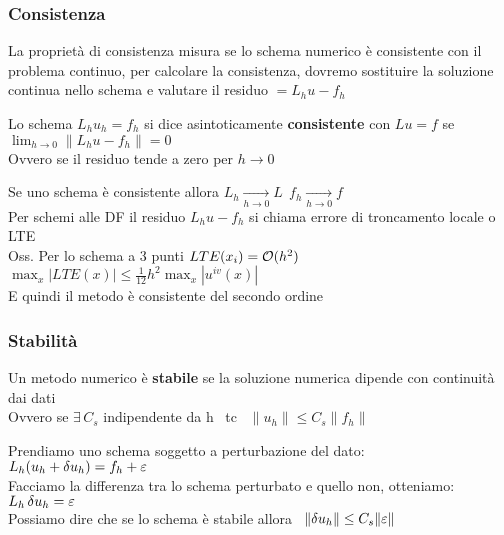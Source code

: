 \documentclass{article}
\let \oldexists \exists
\renewcommand{\exists}{\oldexists\,}
\begin{document}
\subsubsection{Consistenza}

La proprietà di consistenza misura se lo schema numerico è consistente con il problema continuo, per calcolare la consistenza, dovremo sostituire la soluzione continua nello schema e valutare il residuo $= L_h u-f_h$\\

\begin{defi}
    Lo schema $L_hu_h=f_h$ si dice asintoticamente \textbf{consistente} con $Lu=f$ se \ $\displaystyle \lim_{h\to0}\|L_hu-f_h\|=0$\\
    Ovvero se il residuo tende a zero per $h\to0$
\end{defi}

Se uno schema è consistente allora $L_h\xrightarrow[h\to0]{}L \ \ f_h \xrightarrow[h\to0]{}f$\\

Per schemi alle DF il residuo $L_hu-f_h$ si chiama errore di troncamento locale o LTE\\


Oss. Per lo schema a 3 punti $LTE(x_i)=\mathcal O(h^2)$ \ \ $\displaystyle\max_x |LTE(x)|\le \frac{1}{12}h^2\max_{x}|u^{iv}(x)|$\\
E quindi il metodo è consistente del secondo ordine\\




\subsubsection{Stabilità}

\begin{defi}
    Un metodo numerico è \textbf{stabile} se la soluzione numerica dipende con continuità dai dati\\
    Ovvero se $\exists C_s$ indipendente da h \, tc \, $\|u_h\|\le C_s \|f_h\|$
\end{defi}

\phantom{}

Prendiamo uno schema soggetto a perturbazione del dato: \ \ $L_h(u_h+\delta u_h)=f_h+\varepsilon$\\
Facciamo la differenza tra lo schema perturbato e quello non, otteniamo: \ \ $L_h \, \delta u_h=\varepsilon$\\
Possiamo dire che se lo schema è stabile allora \ $\|\delta u_h\|\le C_s \|\varepsilon\|$\\
\end{document}
